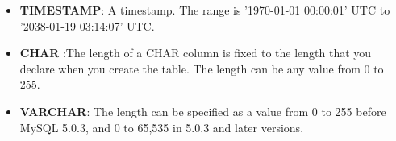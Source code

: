 \documentclass[11pt,a4paper]{article}
\begin{document}
\begin{itemize}
\item{\textbf{TIMESTAMP}}: A timestamp. The range is '1970-01-01 00:00:01' UTC to '2038-01-19 03:14:07' UTC.

\item{\textbf{CHAR}} :The length of a CHAR column is fixed to the length that you declare when you create the table. The length can be any value from 0 to 255.

\item{\textbf{VARCHAR}}: The length can be specified as a value from 0 to 255 before MySQL 5.0.3, and 0 to 65,535 in 5.0.3 and later versions.

\end{itemize}
\end{document}
